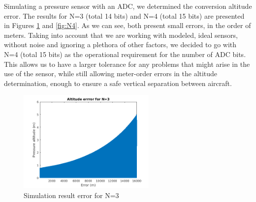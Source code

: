 \documentclass[english,palatino]{ist-report}
\begin{document}
Simulating a pressure sensor with an ADC, we determined the conversion altitude error. The results for N=3 (total 14 bits) and N=4 (total 15 bits) are presented in Figures \ref{fig:N3} and \ref{fig:N4}. As we can see, both present small errors, in the order of meters. Taking into account that we are working with modeled, ideal sensors, without noise and ignoring a plethora of other factors, we decided to go with N=4 (total 15 bits) as the operational requirement for the number of ADC bits. This allows us to have a larger tolerance for any problems that might arise in the use of the sensor, while still allowing meter-order errors in the altitude determination, enough to ensure a safe vertical separation between aircraft.

\begin{figure}
	\centering
	\includegraphics[width=0.6\textwidth]{graphics/N3.png}
	\caption{Simulation result error for N=3}
	\label{fig:N3}
\end{figure}
\end{document}
